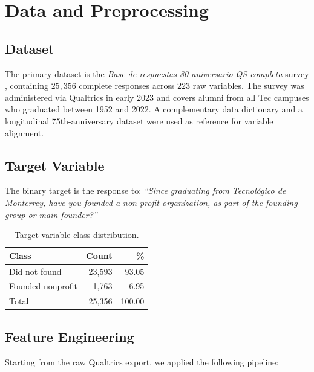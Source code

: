 \documentclass[10pt,twocolumn]{article}
\begin{document}
\section{Data and Preprocessing}
\label{sec:data}

\subsection{Dataset}

The primary dataset is the \emph{Base de respuestas 80 aniversario QS
completa} survey \cite{qs2023}, containing $25{,}356$ complete responses across
$223$ raw variables. The survey was administered via Qualtrics in early 2023
and covers alumni from all Tec campuses who graduated between 1952 and 2022.
A complementary data dictionary and a longitudinal 75th-anniversary dataset
were used as reference for variable alignment.

\subsection{Target Variable}

The binary target is the response to: \emph{``Since graduating from Tecnológico
de Monterrey, have you founded a non-profit organization, as part of the
founding group or main founder?''}

\begin{table}[H]
\centering
\caption{Target variable class distribution.}
\label{tab:target}
\begin{tabular}{lrr}
\toprule
Class & Count & \% \\
\midrule
Did not found    & 23{,}593 & 93.05 \\
Founded nonprofit & 1{,}763  & 6.95  \\
\midrule
Total            & 25{,}356 & 100.00 \\
\bottomrule
\end{tabular}
\end{table}

\subsection{Feature Engineering}

Starting from the raw Qualtrics export, we applied the following pipeline:
\end{document}
